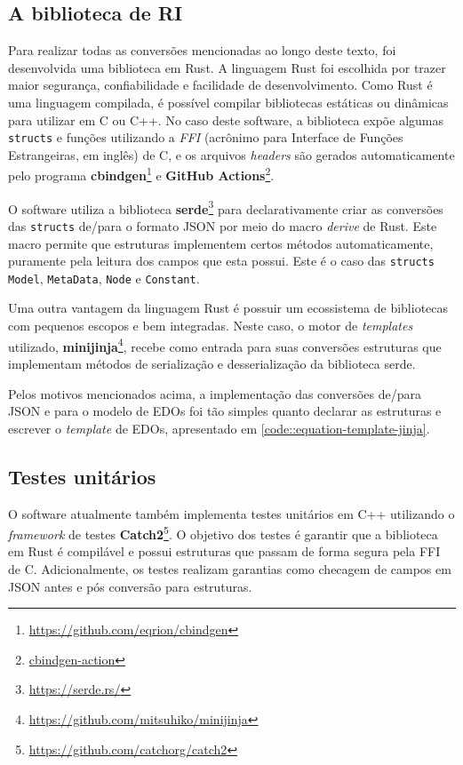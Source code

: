 \documentclass[
	12pt,				%
	openright,			%
	oneside,			%
	a4paper,			%
	main=brazil,
	english,			%
	]{ufsj-abntex2}
\begin{document}
\subsection{A biblioteca de RI}
\label{subsec:biblioteca_RI}

Para realizar todas as conversões mencionadas ao longo deste texto, foi desenvolvida uma biblioteca em Rust. A linguagem Rust foi escolhida por trazer maior segurança, confiabilidade e facilidade de desenvolvimento. Como Rust é uma linguagem compilada, é possível compilar bibliotecas estáticas ou dinâmicas para utilizar em C ou C++. No caso deste software, a biblioteca expõe algumas \texttt{structs} e funções utilizando a \textit{FFI} (acrônimo para Interface de Funções Estrangeiras, em inglês) de C, e os arquivos \textit{headers} são gerados automaticamente pelo programa \textbf{cbindgen}\footnote{\href{https://github.com/eqrion/cbindgen}{https://github.com/eqrion/cbindgen}} e \textbf{GitHub Actions}\footnote{\href{https://github.com/marketplace/actions/cbindgen-action}{cbindgen-action}}.

O software utiliza a biblioteca \textbf{serde}\footnote{\href{https://serde.rs/}{https://serde.rs/}} para declarativamente criar as conversões das \texttt{structs} de/para o formato JSON por meio do macro \textit{derive} de Rust. Este macro permite que estruturas implementem certos métodos automaticamente, puramente pela leitura dos campos que esta possui. Este é o caso das \texttt{structs} \texttt{Model}, \texttt{MetaData}, \texttt{Node} e \texttt{Constant}.

Uma outra vantagem da linguagem Rust é possuir um ecossistema de bibliotecas com pequenos escopos e bem integradas. Neste caso, o motor de \textit{templates} utilizado, \textbf{minijinja}\footnote{\href{https://github.com/mitsuhiko/minijinja}{https://github.com/mitsuhiko/minijinja}}, recebe como entrada para suas conversões estruturas que implementam métodos de serialização e desserialização da biblioteca serde.

Pelos motivos mencionados acima, a implementação das conversões de/para JSON e para o modelo de EDOs foi tão simples quanto declarar as estruturas e escrever o \textit{template} de EDOs, apresentado em \ref{code::equation-template-jinja}.

\subsection{Testes unitários}

O software atualmente também implementa testes unitários em C++ utilizando o \textit{framework} de testes \textbf{Catch2}\footnote{\href{https://github.com/catchorg/catch2}{https://github.com/catchorg/catch2}}. O objetivo dos testes é garantir que a biblioteca em Rust é compilável e possui estruturas que passam de forma segura pela FFI de C. Adicionalmente, os testes realizam garantias como checagem de campos em JSON antes e pós conversão para estruturas.
\end{document}

